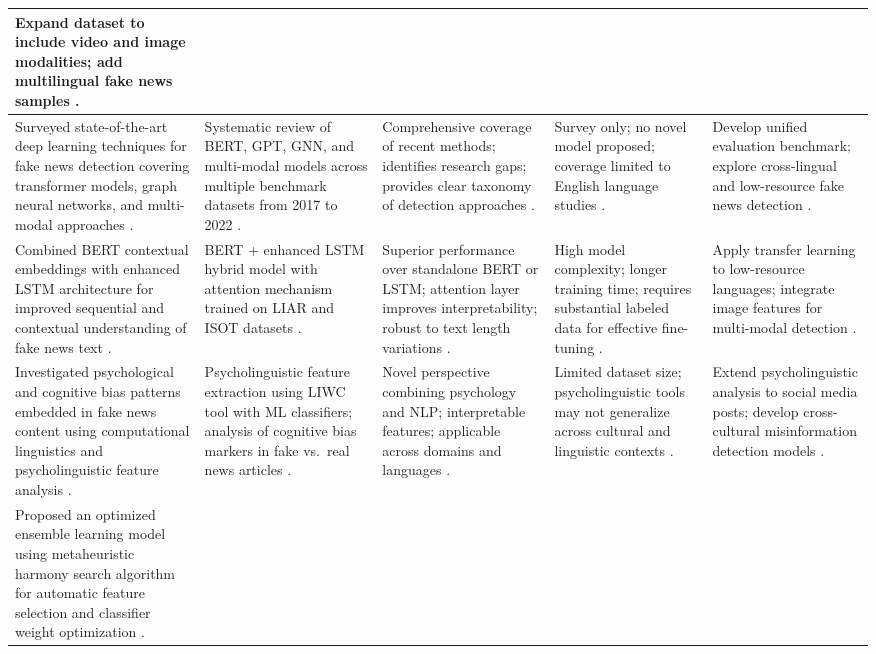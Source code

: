 \documentclass[runningheads]{llncs}
\begin{document}
\begin{longtable}{|p{}|p{}|p{}|p{}|p{}|}
Expand dataset to include video and image modalities; add multilingual fake news samples \cite{Shu2020FakeNewsNet}. \\ \hline
Surveyed state-of-the-art deep learning techniques for fake news detection covering transformer models, graph neural networks, and multi-modal approaches \cite{Mehta2022RecentTrends}. &
Systematic review of BERT, GPT, GNN, and multi-modal models across multiple benchmark datasets from 2017 to 2022 \cite{Mehta2022RecentTrends}. &
Comprehensive coverage of recent methods; identifies research gaps; provides clear taxonomy of detection approaches \cite{Mehta2022RecentTrends}. &
Survey only; no novel model proposed; coverage limited to English language studies \cite{Mehta2022RecentTrends}. &
Develop unified evaluation benchmark; explore cross-lingual and low-resource fake news detection \cite{Mehta2022RecentTrends}. \\ \hline
Combined BERT contextual embeddings with enhanced LSTM architecture for improved sequential and contextual understanding of fake news text \cite{Rai2022FakeNews}. &
BERT + enhanced LSTM hybrid model with attention mechanism trained on LIAR and ISOT datasets \cite{Rai2022FakeNews}. &
Superior performance over standalone BERT or LSTM; attention layer improves interpretability; robust to text length variations \cite{Rai2022FakeNews}. &
High model complexity; longer training time; requires substantial labeled data for effective fine-tuning \cite{Rai2022FakeNews}. &
Apply transfer learning to low-resource languages; integrate image features for multi-modal detection \cite{Rai2022FakeNews}. \\ \hline
Investigated psychological and cognitive bias patterns embedded in fake news content using computational linguistics and psycholinguistic feature analysis \cite{CarrascoFarre2022Fingerprints}. &
Psycholinguistic feature extraction using LIWC tool with ML classifiers; analysis of cognitive bias markers in fake vs.\ real news articles \cite{CarrascoFarre2022Fingerprints}. &
Novel perspective combining psychology and NLP; interpretable features; applicable across domains and languages \cite{CarrascoFarre2022Fingerprints}. &
Limited dataset size; psycholinguistic tools may not generalize across cultural and linguistic contexts \cite{CarrascoFarre2022Fingerprints}. &
Extend psycholinguistic analysis to social media posts; develop cross-cultural misinformation detection models \cite{CarrascoFarre2022Fingerprints}. \\ \hline
Proposed an optimized ensemble learning model using metaheuristic harmony search algorithm for automatic feature selection and classifier weight optimization \cite{Huang2020FakeNews}. &

\end{longtable}
\end{document}
